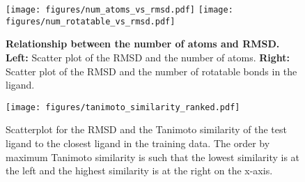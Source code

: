 \documentclass{article} \usepackage{iclr2023_conference,times}
\newcommand{\new}[1]{#1}
\begin{document}
\begin{figure}[htb]
\begin{center}
\texttt{[image: figures/num\_atoms\_vs\_rmsd.pdf]}
\texttt{[image: figures/num\_rotatable\_vs\_rmsd.pdf]}
\caption{\new{\textbf{Relationship between the number of atoms and RMSD.} \textbf{Left:} Scatter plot of the RMSD and the number of atoms. \textbf{Right:} Scatter plot of the RMSD and the number of rotatable bonds in the ligand. }} 
\label{fig:size_vs_rmsd}
\end{center}
 \vskip -0.1cm
\end{figure}

\begin{figure}[t]
    \centering
    \texttt{[image: figures/tanimoto\_similarity\_ranked.pdf]}
    \caption{Scatterplot for the RMSD and the Tanimoto similarity of the test ligand to the closest ligand in the training data. The order by maximum Tanimoto similarity is such that the lowest similarity is at the left and the highest similarity is at the right on the x-axis.}
    \label{fig:tanimoto_similarity}
\end{figure}
\end{document}
